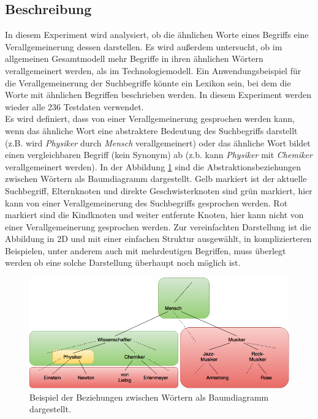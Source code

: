 \documentclass[12pt,a4paper]{report}
\begin{document}
		\subsection*{Beschreibung}
		In diesem Experiment wird analysiert, ob die ähnlichen Worte eines Begriffs eine Verallgemeinerung dessen darstellen. Es wird außerdem untersucht, ob im allgemeinen Gesamtmodell mehr Begriffe in ihren ähnlichen Wörtern verallgemeinert werden, als im Technologiemodell. Ein Anwendungsbeispiel für die Verallgemeinerung der Suchbegriffe könnte ein Lexikon sein, bei dem die Worte mit ähnlichen Begriffen beschrieben werden. In diesem Experiment werden wieder alle 236 Testdaten verwendet.\\
		Es wird definiert, dass von einer Verallgemeinerung gesprochen werden kann, wenn das ähnliche Wort eine abstraktere Bedeutung des Suchbegriffs darstellt (z.B. wird \textit{Physiker} durch \textit{Mensch} verallgemeinert) oder das ähnliche Wort bildet einen vergleichbaren Begriff (kein Synonym) ab (z.b. kann \textit{Physiker} mit \textit{Chemiker} verallgemeinert werden). In der Abbildung \ref{pic:Verallgemeinerung} sind die Abstraktionsbeziehungen zwischen Wörtern als Baumdiagramm dargestellt. Gelb markiert ist der aktuelle Suchbegriff, Elternknoten und direkte Geschwisterknoten sind grün markiert, hier kann von einer Verallgemeinerung des Suchbegriffs gesprochen werden. Rot markiert sind die Kindknoten und weiter entfernte Knoten, hier kann nicht von einer Verallgemeinerung gesprochen werden. Zur vereinfachten Darstellung ist die Abbildung in 2D und mit einer einfachen Struktur ausgewählt, in komplizierteren Beispielen, unter anderem auch mit mehrdeutigen Begriffen, muss überlegt werden ob eine solche Darstellung überhaupt noch möglich ist.\\
		
\begin{figure}[h]
  \begin{center}
	\includegraphics[scale=0.55]{Verallgemeinerung_Baum2.png}
  \end{center}  
  \caption{Beispiel der Beziehungen zwischen Wörtern als Baumdiagramm dargestellt.}
  \label{pic:Verallgemeinerung}
\end{figure}
		
\end{document}
